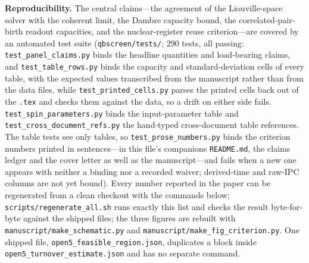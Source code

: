 \documentclass[11pt,a4paper]{article}
\begin{document}
\noindent\textbf{Reproducibility.}
The central claims---the agreement of the Liouville-space solver with the coherent
limit, the Dambre capacity bound, the correlated-pair-birth readout capacities, and
the nuclear-register reuse criterion---are covered by an automated test suite
(\texttt{qbscreen/tests/}; 290 tests, all passing:
\texttt{test\_panel\_claims.py} binds the headline quantities and load-bearing
claims, and \texttt{test\_table\_rows.py} binds the capacity and standard-deviation cells of
every table, with the expected values transcribed from the manuscript rather than
from the data files, while \texttt{test\_printed\_cells.py} parses the printed
cells back out of the \texttt{.tex} and checks them against the data, so a drift
on either side fails. \texttt{test\_spin\_parameters.py} binds the input-parameter
table and \texttt{test\_cross\_document\_refs.py} the hand-typed cross-document
table references. The table tests see only tables, so
\texttt{test\_prose\_numbers.py} binds the criterion numbers printed in
sentences---in this file's companions \texttt{README.md}, the claims ledger and
the cover letter as well as the manuscript---and fails when a new one appears
with neither a binding nor a recorded waiver; derived-time and raw-IPC columns are not yet bound). Every number reported in the paper can be regenerated from a clean checkout with
the commands below; \texttt{scripts/regenerate\_all.sh} runs exactly this list and
checks the result byte-for-byte against the shipped files; the three figures are rebuilt with \texttt{manuscript/make\_schematic.py}
and \texttt{manuscript/make\_fig\_criterion.py}. One shipped file,
\texttt{open5\_feasible\_region.json}, duplicates a block inside
\texttt{open5\_turnover\_estimate.json} and has no separate command.
\end{document}
